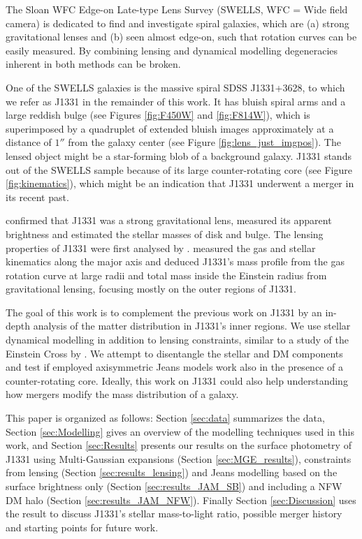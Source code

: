 The Sloan WFC Edge-on Late-type Lens Survey (SWELLS, WFC = Wide field camera) \citep{SWELLSI,SWELLSII,SWELLSIII,SWELLSIV,SWELLSV,SWELLSVI} is dedicated to find and investigate spiral galaxies, which are (a) strong gravitational lenses and (b) seen almost edge-on, such that rotation curves can be easily measured. By combining lensing and dynamical modelling degeneracies inherent in both methods can be broken.

One of the SWELLS galaxies is the massive spiral SDSS J1331+3628, to which we refer as J1331 in the remainder of this work. It has bluish spiral arms and a large reddish bulge (see Figures \ref{fig:F450W} and \ref{fig:F814W}), which is superimposed by a quadruplet of extended bluish images approximately at a distance of $1''$ from the galaxy center (see Figure \ref{fig:lens_just_imgpos}). The lensed object might be a star-forming blob of a background galaxy. J1331 stands out of the SWELLS sample because of its large counter-rotating core (see Figure \ref{fig:kinematics}), which might be an indication that J1331 underwent a merger in its recent past.

\citet{SWELLSI} confirmed that J1331 was a strong gravitational lens, measured its apparent brightness and estimated the stellar masses of disk and bulge. The lensing properties of J1331 were first analysed by \citet{SWELLSIII}. \citet{SWELLSV} measured the gas and stellar kinematics along the major axis and deduced J1331's mass profile from the gas rotation curve at large radii and total mass inside the Einstein radius from gravitational lensing, focusing mostly on the outer regions of J1331.

The goal of this work is to complement the previous work on J1331 by an in-depth analysis of the matter distribution in J1331's inner regions. We use stellar dynamical modelling in addition to lensing constraints, similar to a study of the Einstein Cross by \citet{GlennEC}. We attempt to disentangle the stellar and DM components and test if employed axisymmetric Jeans models work also in the presence of a counter-rotating core. Ideally, this work on J1331 could also help understanding how mergers modify the mass distribution of a galaxy.

This paper is organized as follows: Section \ref{sec:data} summarizes the data, Section \ref{sec:Modelling} gives an overview of the modelling techniques used in this work, and Section \ref{sec:Results} presents our results on the surface photometry of J1331 using Multi-Gaussian expansions (Section \ref{sec:MGE_results}), constraints from lensing (Section \ref{sec:results_lensing}) and Jeans modelling based on the surface brightness only (Section \ref{sec:results_JAM_SB}) and including a NFW DM halo (Section \ref{sec:results_JAM_NFW}). Finally Section \ref{sec:Discussion} uses the result to discuss J1331's stellar mass-to-light ratio, possible merger history and starting points for future work.


